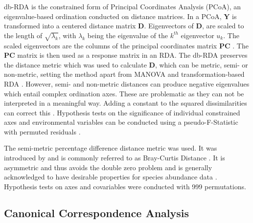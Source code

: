		db-RDA  is the constrained form of Principal Coordinates Analysis (PCoA), an eigenvalue-based ordination conducted on distance matrices.
		In a PCoA, $\mathbf{Y}$ is transformed into a centered distance matrix $\mathbf{D}$.
		Eigenvectors of $\mathbf{D}$, are scaled to the length of $\sqrt{\lambda_k}$, with $\lambda_k$ being the eigenvalue of the $k^{th}$ eigenvector $u_k$. 
		The scaled eigenvectors are the columns of the principal coordinates matrix $\mathbf{PC}$ \citep{gower1966some}.
		The $\mathbf{PC}$ matrix is then used as a response matrix in an RDA. 
		The db-RDA preserves the distance metric which was used to calculate $\mathbf{D}$, which can be metric, semi- or non-metric, setting	 the method apart from MANOVA \citep{anderson2001new} and transformation-based RDA \citep{Legendre2001}. 
		However, semi- and non-metric distances can produce negative eigenvalues which entail complex ordination axes. 
		These are problematic as they can not be interpreted in a meaningful way. 
		Adding a constant to the squared dissimilarities can correct this \citep[\textit{Lingoes correction}, ][]{gower1986metric}.
		Hypothesis tests on the significance of individual constrained axes and environmental variables can be conducted using a pseudo-F-Statistic with permuted residuals  \citep{Legendre2011}.
		  	
		The semi-metric percentage difference distance metric was used. 
		It was introduced by \citet{odum1950bird} and is commonly referred to as Bray-Curtis Distance \citep{Legendre2012}.
		It is asymmetric and thus avoids the double zero problem  \citep{Legendre2012} and is generally acknowledged to have desirable properties for species abundance data \citep{bloom1981similarity,faith1987compositional}.
		Hypothesis tests on axes and covariables were conducted with 999 permutations. 

	
	\subsection{Canonical Correspondence Analysis} \label{subsec:CCA}
	

